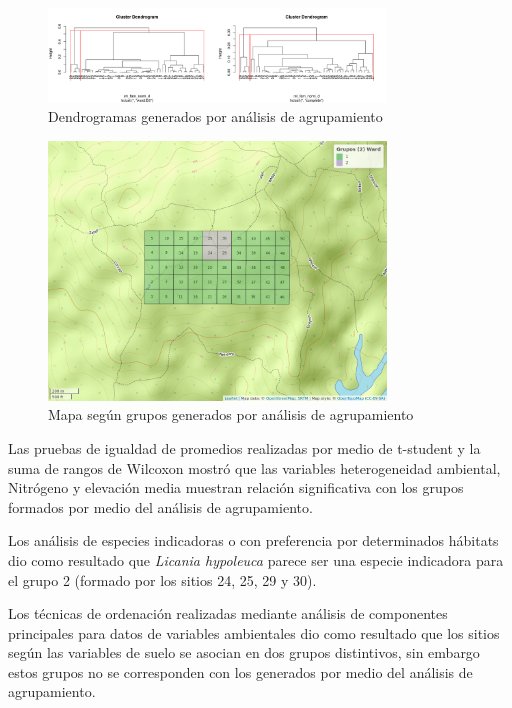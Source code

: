\documentclass[11pt,]{article}
\begin{document}
\begin{figure}
\centering
\includegraphics[width=0.80000\textwidth]{Clusters.png}
\caption{Dendrogramas generados por análisis de
agrupamiento\label{clusters}}
\end{figure}

\begin{figure}
\centering
\includegraphics[width=0.80000\textwidth]{mapa_ward_k2.png}
\caption{Mapa según grupos generados por análisis de
agrupamiento\label{mapagrupos}}
\end{figure}

Las pruebas de igualdad de promedios realizadas por medio de t-student y
la suma de rangos de Wilcoxon mostró que las variables heterogeneidad
ambiental, Nitrógeno y elevación media muestran relación significativa
con los grupos formados por medio del análisis de agrupamiento.

Los análisis de especies indicadoras o con preferencia por determinados
hábitats dio como resultado que \emph{Licania hypoleuca} parece ser una
especie indicadora para el grupo 2 (formado por los sitios 24, 25, 29 y
30).

Los técnicas de ordenación realizadas mediante análisis de componentes
principales para datos de variables ambientales dio como resultado que
los sitios según las variables de suelo se asocian en dos grupos
distintivos, sin embargo estos grupos no se corresponden con los
generados por medio del análisis de agrupamiento.
\end{document}
